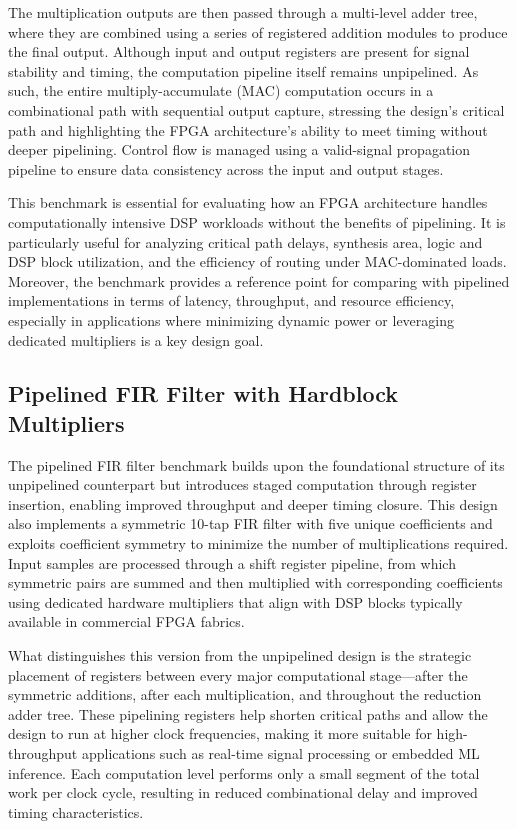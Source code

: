 The multiplication outputs are then passed through a multi-level adder tree, where they are combined using a series of registered addition modules to produce the final output. Although input and output registers are present for signal stability and timing, the computation pipeline itself remains unpipelined. As such, the entire multiply-accumulate (MAC) computation occurs in a combinational path with sequential output capture, stressing the design's critical path and highlighting the FPGA architecture's ability to meet timing without deeper pipelining. Control flow is managed using a valid-signal propagation pipeline to ensure data consistency across the input and output stages.

This benchmark is essential for evaluating how an FPGA architecture handles computationally intensive DSP workloads without the benefits of pipelining. It is particularly useful for analyzing critical path delays, synthesis area, logic and DSP block utilization, and the efficiency of routing under MAC-dominated loads. Moreover, the benchmark provides a reference point for comparing with pipelined implementations in terms of latency, throughput, and resource efficiency, especially in applications where minimizing dynamic power or leveraging dedicated multipliers is a key design goal.

\subsection{Pipelined FIR Filter with Hardblock Multipliers}
The pipelined FIR filter benchmark builds upon the foundational structure of its unpipelined counterpart but introduces staged computation through register insertion, enabling improved throughput and deeper timing closure. This design also implements a symmetric 10-tap FIR filter with five unique coefficients and exploits coefficient symmetry to minimize the number of multiplications required. Input samples are processed through a shift register pipeline, from which symmetric pairs are summed and then multiplied with corresponding coefficients using dedicated hardware multipliers that align with DSP blocks typically available in commercial FPGA fabrics.

What distinguishes this version from the unpipelined design is the strategic placement of registers between every major computational stage—after the symmetric additions, after each multiplication, and throughout the reduction adder tree. These pipelining registers help shorten critical paths and allow the design to run at higher clock frequencies, making it more suitable for high-throughput applications such as real-time signal processing or embedded ML inference. Each computation level performs only a small segment of the total work per clock cycle, resulting in reduced combinational delay and improved timing characteristics.

